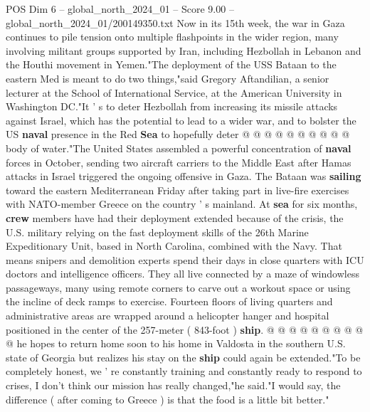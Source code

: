 \begin{textsample}{POS Dim 6 – global\_north\_2024\_01 – Score 9.00 – global\_north\_2024\_01/200149350.txt}
Now in its 15th week, the war in Gaza continues to pile tension onto multiple flashpoints in the wider region, many involving militant groups supported by Iran, including Hezbollah in Lebanon and the Houthi movement in Yemen."The deployment of the USS Bataan to the eastern Med is meant to do two things,"said Gregory Aftandilian, a senior lecturer at the School of International Service, at the American University in Washington DC."It ' s to deter Hezbollah from increasing its missile attacks against Israel, which has the potential to lead to a wider war, and to bolster the US \textbf{naval} presence in the Red \textbf{Sea} to hopefully deter @ @ @ @ @ @ @ @ @ @ body of water."The United States assembled a powerful concentration of \textbf{naval} forces in October, sending two aircraft carriers to the Middle East after Hamas attacks in Israel triggered the ongoing offensive in Gaza.
The Bataan was \textbf{sailing} toward the eastern Mediterranean Friday after taking part in live-fire exercises with NATO-member Greece on the country ' s mainland.
At \textbf{sea} for six months, \textbf{crew} members have had their deployment extended because of the crisis, the U.S. military relying on the fast deployment skills of the 26th Marine Expeditionary Unit, based in North Carolina, combined with the Navy.
That means snipers and demolition experts spend their days in close quarters with ICU doctors and intelligence officers.
They all live connected by a maze of windowless passageways, many using remote corners to carve out a workout space or using the incline of deck ramps to exercise.
Fourteen floors of living quarters and administrative areas are wrapped around a helicopter hanger and hospital positioned in the center of the 257-meter ( 843-foot ) \textbf{ship}. @ @ @ @ @ @ @ @ @ @ he hopes to return home soon to his home in Valdosta in the southern U.S. state of Georgia but realizes his stay on the \textbf{ship} could again be extended."To be completely honest, we ' re constantly training and constantly ready to respond to crises, I don't think our mission has really changed,"he said."I would say, the difference ( after coming to Greece ) is that the food is a little bit better."

\end{textsample}
